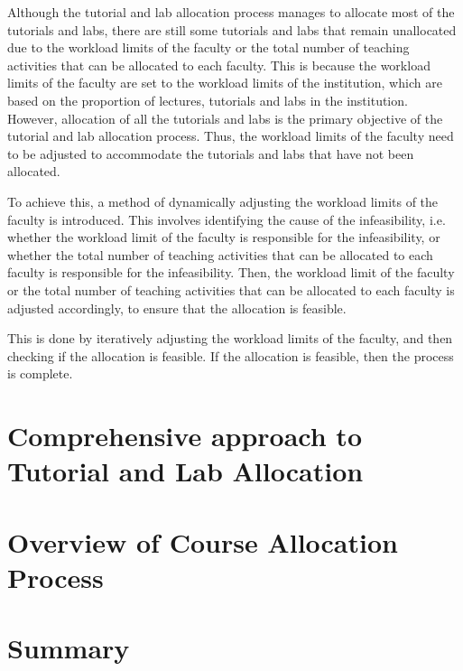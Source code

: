 

Although the tutorial and lab allocation process manages to allocate most of the tutorials and labs, there are still some tutorials and labs that remain unallocated due to the workload limits of the faculty or the total number of teaching activities that can be allocated to each faculty. This is because the workload limits of the faculty are set to the workload limits of the institution, which are based on the proportion of lectures, tutorials and labs in the institution. However, allocation of all the tutorials and labs is the primary objective of the tutorial and lab allocation process. Thus, the workload limits of the faculty need to be adjusted to accommodate the tutorials and labs that have not been allocated.

To achieve this, a method of dynamically adjusting the workload limits of the faculty is introduced. This involves identifying the cause of the infeasibility, i.e. whether the workload limit of the faculty is responsible for the infeasibility, or whether the total number of teaching activities that can be allocated to each faculty is responsible for the infeasibility. Then, the workload limit of the faculty or the total number of teaching activities that can be allocated to each faculty is adjusted accordingly, to ensure that the allocation is feasible.

This is done by iteratively adjusting the workload limits of the faculty, and then checking if the allocation is feasible. If the allocation is feasible, then the process is complete.

\section{Comprehensive approach to Tutorial and Lab Allocation}


\section{Overview of Course Allocation Process}


\section{Summary}
